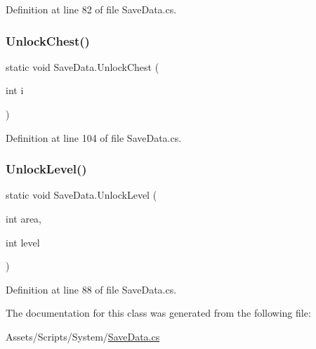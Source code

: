 Definition at line 82 of file Save\+Data.\+cs.

\mbox{\label{class_save_data_ab5229c785ecca1e100795a57ce9d50cc}} 
\subsubsection{\texorpdfstring{Unlock\+Chest()}{UnlockChest()}}
{\footnotesize\ttfamily static void Save\+Data.\+Unlock\+Chest (\begin{DoxyParamCaption}\item[{int}]{i }\end{DoxyParamCaption})\hspace{0.3cm}{\ttfamily [static]}}



Definition at line 104 of file Save\+Data.\+cs.

\mbox{\label{class_save_data_aec63ccf3e0c1ac28e5f77f82129d6d35}} 
\subsubsection{\texorpdfstring{Unlock\+Level()}{UnlockLevel()}}
{\footnotesize\ttfamily static void Save\+Data.\+Unlock\+Level (\begin{DoxyParamCaption}\item[{int}]{area,  }\item[{int}]{level }\end{DoxyParamCaption})\hspace{0.3cm}{\ttfamily [static]}}



Definition at line 88 of file Save\+Data.\+cs.



The documentation for this class was generated from the following file\+:\begin{DoxyCompactItemize}
\item 
Assets/\+Scripts/\+System/\mbox{\hyperlink{_save_data_8cs}{Save\+Data.\+cs}}\end{DoxyCompactItemize}

